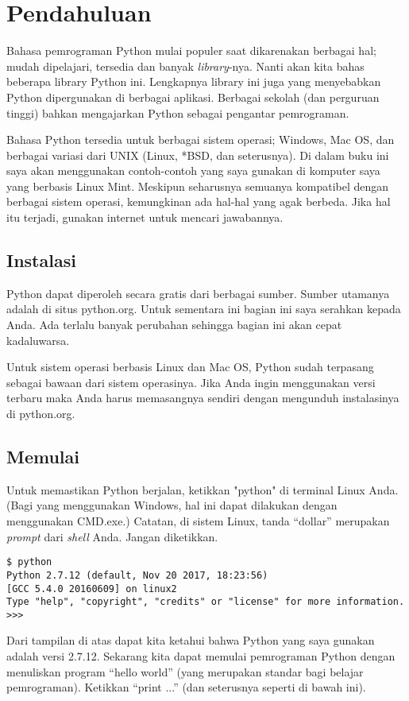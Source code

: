 \chapter{Pendahuluan}
Bahasa pemrograman Python mulai populer saat dikarenakan berbagai hal; mudah
dipelajari, tersedia dan banyak {\em library}-nya. Nanti akan kita bahas beberapa
library Python ini. Lengkapnya library ini juga yang menyebabkan
Python dipergunakan di berbagai aplikasi. Berbagai sekolah (dan
perguruan tinggi) bahkan mengajarkan Python sebagai pengantar pemrograman.

Bahasa Python tersedia untuk berbagai sistem operasi; Windows, Mac OS, dan
berbagai variasi dari UNIX (Linux, *BSD, dan seterusnya). Di dalam buku ini
saya akan menggunakan contoh-contoh yang saya gunakan di komputer saya yang
berbasis Linux Mint. Meskipun seharusnya semuanya kompatibel dengan berbagai
sistem operasi, kemungkinan ada hal-hal yang agak berbeda. Jika hal itu
terjadi, gunakan internet untuk mencari jawabannya.

\section{Instalasi}
Python dapat diperoleh secara gratis dari berbagai sumber. Sumber utamanya
adalah di situs python.org. Untuk sementara ini bagian ini saya serahkan kepada
Anda. Ada terlalu banyak perubahan sehingga bagian ini akan cepat kadaluwarsa.

Untuk sistem operasi berbasis Linux dan Mac OS, Python sudah terpasang sebagai
bawaan dari sistem operasinya. Jika Anda ingin menggunakan versi terbaru maka
Anda harus memasangnya sendiri dengan mengunduh instalasinya di python.org.

\section{Memulai}
Untuk memastikan Python berjalan, ketikkan "python" di terminal Linux Anda.
(Bagi yang menggunakan Windows, hal ini dapat dilakukan dengan menggunakan
CMD.exe.) Catatan, di sistem Linux, tanda ``dollar'' merupakan {\em prompt}
dari {\em shell} Anda. Jangan diketikkan.

\begin{verbatim}
$ python
Python 2.7.12 (default, Nov 20 2017, 18:23:56) 
[GCC 5.4.0 20160609] on linux2
Type "help", "copyright", "credits" or "license" for more information.
>>> 
\end{verbatim}

Dari tampilan di atas dapat kita ketahui bahwa Python yang saya gunakan adalah
versi 2.7.12. Sekarang kita dapat memulai pemrograman Python dengan menuliskan
program ``hello world'' (yang merupakan standar bagi belajar pemrograman).
Ketikkan ``print ...'' (dan seterusnya seperti di bawah ini).

